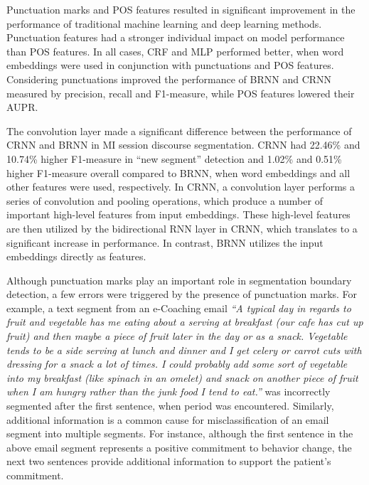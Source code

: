 \documentclass{amia}
\begin{document}
Punctuation marks and POS features resulted in significant improvement in the performance of traditional machine learning and deep learning methods. Punctuation features had a stronger individual impact on model performance than POS features. In all cases, CRF and MLP performed better, when word embeddings were used in conjunction with punctuations and POS features. Considering punctuations improved the performance of BRNN and CRNN measured by precision, recall and F1-measure, while POS features lowered their AUPR. %

The convolution layer made a significant difference between the performance of CRNN and BRNN in MI session discourse segmentation. CRNN had 22.46\% and 10.74\% higher F1-measure in ``new segment'' detection and 1.02\% and 0.51\% higher F1-measure overall compared to BRNN, when word embeddings and all other features were used, respectively. In CRNN, a convolution layer performs a series of convolution and pooling operations, which produce a number of important high-level features from input embeddings. These high-level features are then utilized by the bidirectional RNN layer in CRNN, which translates to a significant increase in performance. In contrast, BRNN utilizes the input embeddings directly as features.     

Although punctuation marks play an important role in segmentation boundary detection, a few errors were triggered by the presence of punctuation marks. For example, a text segment from an e-Coaching email \textit{``A typical day in regards to fruit and vegetable has me eating about a serving at breakfast (our cafe has cut up fruit) and then maybe a piece of fruit later in the day or as a snack. Vegetable tends to be a side serving at lunch and dinner and I get celery or carrot cuts with dressing for a snack a lot of times. I could probably add some sort of vegetable into my breakfast (like spinach in an omelet) and snack on another piece of fruit when I am hungry rather than the junk food I tend to eat.''} was incorrectly segmented after the first sentence, when period was encountered. Similarly, additional information is a common cause for misclassification of an email segment into multiple segments. For instance, although the first sentence in the above email segment represents a positive commitment to behavior change, the next two sentences provide additional information to support the patient's commitment. 
\end{document}
